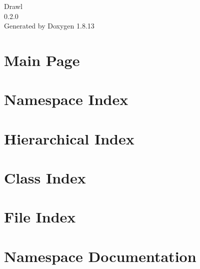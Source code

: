 \documentclass[twoside]{book}
\newcommand{\+}{\discretionary{\mbox{\scriptsize$\hookleftarrow$}}{}{}}
\newcommand{\clearemptydoublepage}{%
  \newpage{\pagestyle{empty}\cleardoublepage}%
}
\begin{document}
\hypersetup{pageanchor=false,
             bookmarksnumbered=true,
             pdfencoding=unicode
            }
\begin{titlepage}
\vspace*{7cm}
\begin{center}%
{\Large Drawl \\[1ex]\large 0.\+2.\+0 }\\
\vspace*{1cm}
{\large Generated by Doxygen 1.8.13}\\
\end{center}
\end{titlepage}
\clearemptydoublepage
{}
\tableofcontents
\clearemptydoublepage
{}
\hypersetup{pageanchor=true}

\chapter{Main Page}
\label{index}\hypertarget{index}{}
\chapter{Namespace Index}

\chapter{Hierarchical Index}

\chapter{Class Index}

\chapter{File Index}

\chapter{Namespace Documentation}




\end{document}
